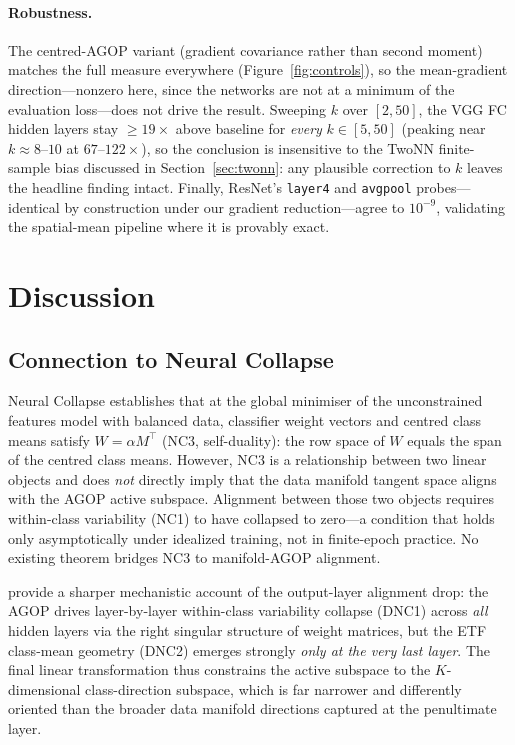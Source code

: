 \documentclass{article}
\begin{document}
\paragraph{Robustness.}
The centred-AGOP variant (gradient covariance rather than second moment)
matches the full measure everywhere (Figure~\ref{fig:controls}), so the
mean-gradient direction---nonzero here, since the networks are not at a
minimum of the evaluation loss---does not drive the result.  Sweeping $k$
over $[2, 50]$, the VGG FC hidden layers stay $\ge 19\times$ above baseline
for \emph{every} $k \in [5, 50]$ (peaking near $k \approx 8$--$10$ at
$67$--$122\times$), so the conclusion is insensitive to the TwoNN
finite-sample bias discussed in Section~\ref{sec:twonn}: any plausible
correction to $k$ leaves the headline finding intact.  Finally, ResNet's
\texttt{layer4} and \texttt{avgpool} probes---identical by construction
under our gradient reduction---agree to $10^{-9}$, validating the
spatial-mean pipeline where it is provably exact.

\section{Discussion}
\label{sec:discussion}

\subsection{Connection to Neural Collapse}
\label{sec:nc}

Neural Collapse \citep{papyan2020prevalence,zhu2021geometric} establishes that
at the global minimiser of the unconstrained features model with balanced data,
classifier weight vectors and centred class means satisfy $W = \alpha M^\top$
(NC3, self-duality): the row space of $W$ equals the span of the centred class
means.  However, NC3 is a relationship between two linear objects and does
\emph{not} directly imply that the data manifold tangent space aligns with the
AGOP active subspace.  Alignment between those two objects requires within-class
variability (NC1) to have collapsed to zero---a condition that holds only
asymptotically under idealized training, not in finite-epoch practice.  No
existing theorem bridges NC3 to manifold-AGOP alignment.

\citet{beaglehole2024agop} provide a sharper mechanistic account of the
output-layer alignment drop: the AGOP drives layer-by-layer within-class
variability collapse (DNC1) across \emph{all} hidden layers via the right
singular structure of weight matrices, but the ETF class-mean geometry (DNC2)
emerges strongly \emph{only at the very last layer}.  The final linear
transformation thus constrains the active subspace to the $K$-dimensional
class-direction subspace, which is far narrower and differently oriented than
the broader data manifold directions captured at the penultimate layer.
\end{document}
